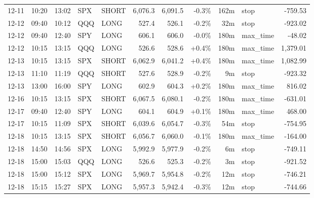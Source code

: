 \documentclass[11pt,a4paper,twoside]{article}
\begin{document}
\begin{center}
\begin{longtable}{>{\color{txtmain}}l l l l l r r r r >{\color{txtmain}}l r}
12-11 & 10:20 & 13:02 & SPX & SHORT & 6,076.3 & 6,091.5 & \textcolor{lossred}{-0.3\%} & 162m & stop & \textcolor{lossred}{-759.53} \\
12-12 & 09:40 & 10:12 & QQQ & LONG & 527.4 & 526.1 & \textcolor{lossred}{-0.2\%} & 32m & stop & \textcolor{lossred}{-923.02} \\
12-12 & 09:40 & 12:40 & SPY & LONG & 606.1 & 606.0 & \textcolor{lossred}{-0.0\%} & 180m & max\_time & \textcolor{lossred}{-48.02} \\
12-12 & 10:15 & 13:15 & QQQ & LONG & 526.6 & 528.6 & \textcolor{wingreen}{+0.4\%} & 180m & max\_time & \textcolor{wingreen}{1,379.01} \\
12-13 & 10:15 & 13:15 & SPX & SHORT & 6,062.9 & 6,041.2 & \textcolor{wingreen}{+0.4\%} & 180m & max\_time & \textcolor{wingreen}{1,082.99} \\
12-13 & 11:10 & 11:19 & QQQ & SHORT & 527.6 & 528.9 & \textcolor{lossred}{-0.2\%} & 9m & stop & \textcolor{lossred}{-923.32} \\
12-13 & 13:00 & 16:00 & SPY & LONG & 602.9 & 604.3 & \textcolor{wingreen}{+0.2\%} & 180m & max\_time & \textcolor{wingreen}{816.02} \\
12-16 & 10:15 & 13:15 & SPX & SHORT & 6,067.5 & 6,080.1 & \textcolor{lossred}{-0.2\%} & 180m & max\_time & \textcolor{lossred}{-631.01} \\
12-17 & 09:40 & 12:40 & SPY & LONG & 604.1 & 604.9 & \textcolor{wingreen}{+0.1\%} & 180m & max\_time & \textcolor{wingreen}{468.00} \\
12-17 & 10:15 & 11:09 & SPX & SHORT & 6,039.6 & 6,054.7 & \textcolor{lossred}{-0.3\%} & 54m & stop & \textcolor{lossred}{-754.95} \\
12-18 & 10:15 & 13:15 & SPX & SHORT & 6,056.7 & 6,060.0 & \textcolor{lossred}{-0.1\%} & 180m & max\_time & \textcolor{lossred}{-164.00} \\
12-18 & 14:50 & 14:56 & SPX & LONG & 5,992.9 & 5,977.9 & \textcolor{lossred}{-0.2\%} & 6m & stop & \textcolor{lossred}{-749.11} \\
12-18 & 15:00 & 15:03 & QQQ & LONG & 526.6 & 525.3 & \textcolor{lossred}{-0.2\%} & 3m & stop & \textcolor{lossred}{-921.52} \\
12-18 & 15:00 & 15:12 & SPX & LONG & 5,969.7 & 5,954.8 & \textcolor{lossred}{-0.2\%} & 12m & stop & \textcolor{lossred}{-746.21} \\
12-18 & 15:15 & 15:27 & SPX & LONG & 5,957.3 & 5,942.4 & \textcolor{lossred}{-0.3\%} & 12m & stop & \textcolor{lossred}{-744.66} \\

\end{longtable}
\end{center}
\end{document}
